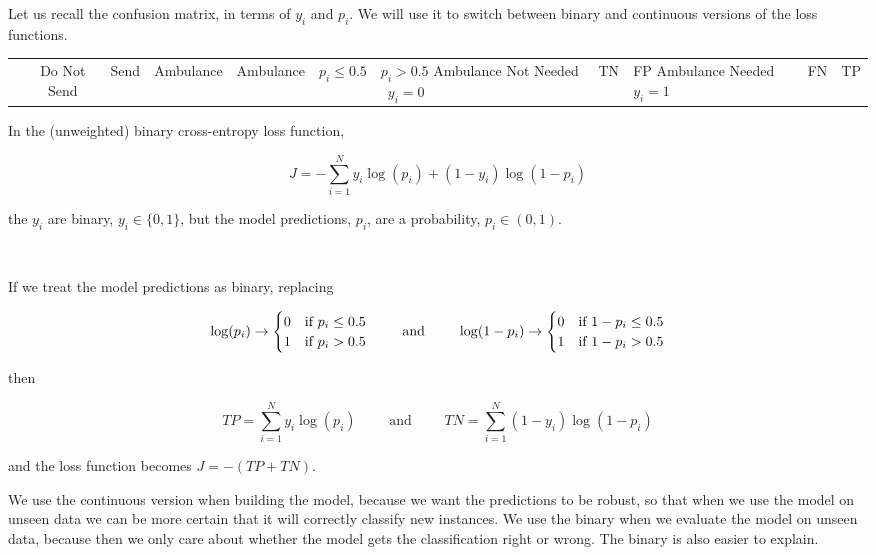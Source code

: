 Let us recall the confusion matrix, in terms of $y_i$ and $p_i$.  We will use it to switch between binary and continuous versions of the loss functions.

\begin{center}
\begin{tabular}{r|c|c|c|}
	& Do Not Send & Send \cr
	& Ambulance & Ambulance \cr
	& $p_i \le 0.5$ & $p_i>0.5$  \vrule width 0pt height 0 pt depth 5pt \cr \hline
	Ambulance Not Needed \  $y_i=0$ & TN & FP \vrule width 0pt height 11pt depth 5pt \cr \hline
	Ambulance Needed \   $y_i=1$ & FN & TP \vrule width 0pt height 11pt depth 5pt \cr\hline
\end{tabular}
\end{center}

In the (unweighted) binary cross-entropy loss function, 

$$J = -\sum_{i=1}^N y_i \log( p_i) + (1-y_i) \log( 1 - p_i)$$

the $y_i$ are binary, $y_i \in \{0,1\}$, but the model predictions, $p_i$, are a probability, $p_i \in (0,1)$.  


\

If we treat the model predictions as binary, replacing 

$$
\log ( p_i) \to 
\begin{cases}
	0 & \text{if } p_i \le 0.5 \cr
	1 & \text{if } p_i > 0.5 \cr
\end{cases}
\qquad
\text{ and }
\qquad
\log ( 1 -  p_i) \to 
\begin{cases}
	0 & \text{if } 1 - p_i \le 0.5 \cr
	1 & \text{if } 1 - p_i > 0.5 \cr
\end{cases}
$$

then 

$$ TP = \sum_{i=1}^N y_i \log( p_i)
\qquad
\text{ and }
\qquad
TN = \sum_{i=1}^N  (1-y_i) \log( 1 - p_i)$$

and the loss function becomes $J = -(TP+TN)$.

We use the continuous version when building the model, because we want the predictions to be robust, so that when we use the model on unseen data we can be more certain that it will correctly classify new instances.  We use the binary when we evaluate the model on unseen data, because then we only care about whether the model gets the classification right or wrong.  The binary is also easier to explain.


